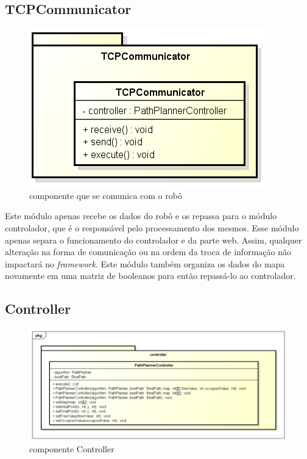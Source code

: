 \subsection{TCPCommunicator}

\begin{figure}[h]
	\centering
	\label{fig24}
		\includegraphics[keepaspectratio=true,scale=0.6]{figuras/tcp.png}
	\caption{componente que se comunica com o robô}
\end{figure}

Este módulo apenas recebe os dados do robô e os repassa para o módulo controlador, que é o responsável pelo processamento dos mesmos. Esse módulo apenas separa o funcionamento do controlador e da parte web. Assim, qualquer alteração na forma de comunicação ou na ordem da troca de informação não impactará no \textit{framework}. Este módulo também organiza os dados do mapa novamente em uma matriz de booleanos para então repassá-lo ao controlador.

\subsection{Controller}

\begin{figure}[h]
	\centering
	\label{fig25}
		\includegraphics[keepaspectratio=true,scale=0.6]{figuras/pkgcontroller.png}
	\caption{componente Controller}
\end{figure}


